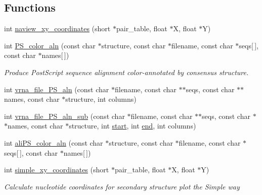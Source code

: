 \subsection*{Functions}
\begin{DoxyCompactItemize}
\item 
int \mbox{\hyperlink{group__plotting__utils_ga948111b910926f0405a3fa920c790816}{naview\+\_\+xy\+\_\+coordinates}} (short $\ast$pair\+\_\+table, float $\ast$X, float $\ast$Y)
\item 
int \mbox{\hyperlink{group__plotting__utils_ga821802c3685e37e15182341f6217470d}{P\+S\+\_\+color\+\_\+aln}} (const char $\ast$structure, const char $\ast$filename, const char $\ast$seqs\mbox{[}$\,$\mbox{]}, const char $\ast$names\mbox{[}$\,$\mbox{]})
\begin{DoxyCompactList}\small\item\em Produce Post\+Script sequence alignment color-\/annotated by consensus structure. \end{DoxyCompactList}\item 
int \mbox{\hyperlink{group__plotting__utils_ga76b5c0637db9385a553cdd8e66e61eca}{vrna\+\_\+file\+\_\+\+P\+S\+\_\+aln}} (const char $\ast$filename, const char $\ast$$\ast$seqs, const char $\ast$$\ast$names, const char $\ast$structure, int columns)
\item 
int \mbox{\hyperlink{group__plotting__utils_ga2881c9b855baff948f92b93262df9ff6}{vrna\+\_\+file\+\_\+\+P\+S\+\_\+aln\+\_\+sub}} (const char $\ast$filename, const char $\ast$$\ast$seqs, const char $\ast$$\ast$names, const char $\ast$structure, int \mbox{\hyperlink{special__const_8h_ab53016e6941484f46238d59e2549decb}{start}}, int \mbox{\hyperlink{special__const_8h_acc28e141c890270905160748bebdc3ed}{end}}, int columns)
\item 
int \mbox{\hyperlink{group__plotting__utils_gaab48d4dac655d688abe921389ac2847c}{ali\+P\+S\+\_\+color\+\_\+aln}} (const char $\ast$structure, const char $\ast$filename, const char $\ast$seqs\mbox{[}$\,$\mbox{]}, const char $\ast$names\mbox{[}$\,$\mbox{]})
\item 
int \mbox{\hyperlink{group__plotting__utils_gaf4b9173e7d3fd361c3c85e6def194123}{simple\+\_\+xy\+\_\+coordinates}} (short $\ast$pair\+\_\+table, float $\ast$X, float $\ast$Y)
\begin{DoxyCompactList}\small\item\em Calculate nucleotide coordinates for secondary structure plot the {\itshape Simple way} \end{DoxyCompactList}\item 

\end{DoxyCompactItemize}
